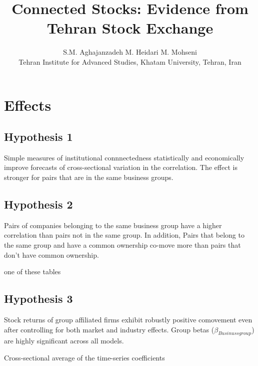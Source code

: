 \documentclass[12pt, a4paper]{article}
\title{Connected Stocks: Evidence from Tehran Stock Exchange}
\author{S.M. Aghajanzadeh\sym{*} \qquad M. Heidari\sym{*} \qquad M. Mohseni\sym{*} \\
	\sym{*} \footnotesize  Tehran Institute for Advanced Studies, Khatam University, Tehran, Iran
}
\begin{document}
	\maketitle
\section*{Effects}
\subsection*{\textbf{Hypothesis 1}}
 Simple measures of institutional connnectedness statistically and economically improve forecasts of cross-sectional variation in the correlation. The effect is stronger for pairs that are in the same business groups.

		\begin{table}[htbp]
	\centering
	\resizebox{\textwidth}{!}{
		
	}
\end{table}

	\FloatBarrier
	\newpage
	
\subsection*{\textbf{Hypothesis 2}}
 Pairs of companies belonging to the same business group have a higher correlation than pairs not in the same group. In addition, Pairs that belong to the same group and have a common ownership co-move more than pairs that don't have common ownership. 
		\begin{table}[htbp]
	\centering
	\caption{one of these tables}
	\resizebox{\textwidth}{!}{
		
	}
\newline
\resizebox{\textwidth}{!}{
	
}
\end{table}

\newpage
\subsection*{\textbf{Hypothesis 3}} 
Stock returns of group affiliated firms exhibit robustly positive comovement even after controlling for both market and industry effects. Group betas
($ \beta_{Businussgroup} $) are highly significant across all models.

			\begin{table}[htbp]
		\centering
		\caption{Cross-sectional average of the time-series coefficients}
		\resizebox{\textwidth}{!}{
			
		}
	\end{table}
\end{document}

